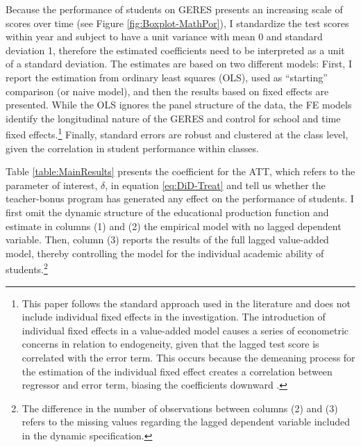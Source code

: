 \documentclass[a4paper, 12pt]{article}
\begin{document}
Because the performance of students on GERES presents an increasing scale of scores over time (see Figure \ref{fig:Boxplot-MathPor}), I standardize the test scores within year and subject to have a unit variance with mean 0 and standard deviation 1, therefore the estimated coefficients need to be interpreted as a unit of a standard deviation. The estimates are based on two different models: First, I report the estimation from ordinary least squares (OLS), used as “starting” comparison (or naive model), and then the results based on fixed effects are presented. While the OLS ignores the panel structure of the data, the FE models identify the longitudinal nature of the GERES and control for school and time fixed effects.\footnote{This paper follows the standard approach used in the literature \citep[see e.g.][]{loyalka2019pay,barrera2017teacher, britton2016teacher, imberman2015incentive} and does not include individual fixed effects in the investigation. The introduction of individual fixed effects in a value-added model causes a series of econometric concerns in relation to endogeneity, given that the lagged test score is correlated with the error term. This occurs because the demeaning process for the estimation of the individual fixed effect creates a correlation between regressor and error term, biasing the coefficients downward \citep{nickell1981biases}.} Finally, standard errors are robust and clustered at the class level, given the correlation in student performance within classes. 










Table \ref{table:MainResults} presents the coefficient for the ATT, which refers to the parameter of interest, $\delta$, in equation \eqref{eq:DiD-Treat} and tell us whether the teacher-bonus program has generated any effect on the performance of students. I first omit the dynamic structure of the educational production function and estimate in columns (1) and (2) the empirical model with no lagged dependent variable. Then, column (3) reports the results of the full lagged value-added model, thereby controlling the model for the individual academic ability of students.\footnote{The difference in the number of observations between columns (2) and (3) refers to the missing values regarding the lagged dependent variable included in the dynamic specification.}
\end{document}
